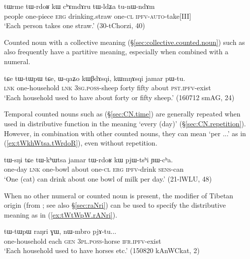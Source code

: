 \begin{exe}
	\ex \label{ex:tWrme.tWrdoR2}
	\gll tɯrme tɯ-rdoʁ kɯ cʰɤmdɤru tɯ-ldʑa tu-nɯ-ndɤm  \\
	people one-piece \textsc{erg} drinking.straw one-\textsc{cl} \textsc{ipfv}-\textsc{auto}-take[III] \\
	\glt `Each person takes one straw.' (30-tChorzi, 40)
\end{exe}
 

Counted noun with a collective meaning (§\ref{sec:collective.counted.noun}) such as  also frequently have a partitive meaning, especially when combined with a numeral.

\begin{exe}
	\ex \label{ex:tWtWpW.tCe}
	\gll tɕe tɯ-tɯpɯ tɕe, ɯ-qaʑo kɯβdɤsqi, kɯmŋɤsqi jamar pɯ-tu. \\
	\textsc{lnk} one-household \textsc{lnk} \textsc{3sg}.\textsc{poss}-sheep forty fifty about \textsc{pst}.\textsc{ipfv}-exist \\
	\glt `Each household used to have about forty or fifty sheep.' (160712 smAG, 24)
\end{exe} 


Temporal counted nouns such as  (§\ref{sec:CN.time}) are generally repeated when used in distributive function in the meaning `every (day)' (§\ref{sec:CN.repetition}). However, in combination with other counted nouns, they can mean `per ...' as in (\ref{ex:tWkhWtsa.tWrdoR}), even without repetition.

\begin{exe}
	\ex \label{ex:tWkhWtsa.tWrdoR}
	\gll tɯ-sŋi tɕe tɯ-kʰɯtsa jamar tɯ-rdoʁ kɯ pjɯ-tsʰi ɲɯ-cʰa. \\
	one-day \textsc{lnk} one-bowl about one-\textsc{cl} \textsc{erg} \textsc{ipfv}-drink \textsc{sens}-can \\
	\glt `One (cat) can drink about one bowl of milk per day.' (21-lWLU, 48)
\end{exe}

When no other numeral or counted noun is present, the modifier of Tibetan origin  (from ; see also §\ref{sec:raNri}) can be used to specify the distributive meaning as in (\ref{ex:tWtWpW.rANri}).

\begin{exe}
	\ex \label{ex:tWtWpW.rANri}
	\gll tɯ-tɯpɯ raŋri ɣɯ, nɯ-mbro pjɤ-tu... \\
	one-household  each \textsc{gen} \textsc{3pl}.\textsc{poss}-horse \textsc{ifr}.\textsc{ipfv}-exist \\
	\glt `Each household used to have horses etc.' (150820 kAnWCkat, 2)
\end{exe} 

